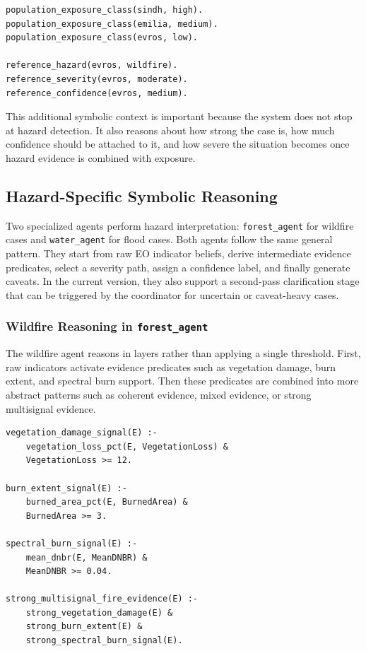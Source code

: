 \documentclass[11pt,a4paper]{article}
\begin{document}
\begin{lstlisting}
population_exposure_class(sindh, high).
population_exposure_class(emilia, medium).
population_exposure_class(evros, low).

reference_hazard(evros, wildfire).
reference_severity(evros, moderate).
reference_confidence(evros, medium).
\end{lstlisting}

This additional symbolic context is important because the system does not stop at hazard detection. It also reasons about how strong the case is, how much confidence should be attached to it, and how severe the situation becomes once hazard evidence is combined with exposure.

\subsection{Hazard-Specific Symbolic Reasoning}

Two specialized agents perform hazard interpretation: \texttt{forest\_agent} for wildfire cases and \texttt{water\_agent} for flood cases. Both agents follow the same general pattern. They start from raw EO indicator beliefs, derive intermediate evidence predicates, select a severity path, assign a confidence label, and finally generate caveats. In the current version, they also support a second-pass clarification stage that can be triggered by the coordinator for uncertain or caveat-heavy cases.

\subsubsection{Wildfire Reasoning in \texttt{forest\_agent}}

The wildfire agent reasons in layers rather than applying a single threshold. First, raw indicators activate evidence predicates such as vegetation damage, burn extent, and spectral burn support. Then these predicates are combined into more abstract patterns such as coherent evidence, mixed evidence, or strong multisignal evidence.

\begin{lstlisting}
vegetation_damage_signal(E) :-
    vegetation_loss_pct(E, VegetationLoss) &
    VegetationLoss >= 12.

burn_extent_signal(E) :-
    burned_area_pct(E, BurnedArea) &
    BurnedArea >= 3.

spectral_burn_signal(E) :-
    mean_dnbr(E, MeanDNBR) &
    MeanDNBR >= 0.04.

strong_multisignal_fire_evidence(E) :-
    strong_vegetation_damage(E) &
    strong_burn_extent(E) &
    strong_spectral_burn_signal(E).
\end{lstlisting}
\end{document}
